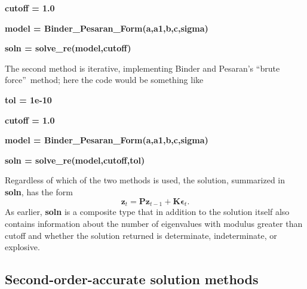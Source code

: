 \documentclass[thmsa,notitlepage,11pt]{article}
\begin{document}
\bigskip

\textbf{cutoff = 1.0}

\textbf{model = Binder\_Pesaran\_Form(a,a1,b,c,sigma)}

\textbf{soln = solve\_re(model,cutoff)}

\bigskip

The second method is iterative, implementing Binder and Pesaran's
\textquotedblleft brute force\textquotedblright\ method; here the code would
be something like

\bigskip

\textbf{tol = 1e-10}

\textbf{cutoff = 1.0}

\textbf{model = Binder\_Pesaran\_Form(a,a1,b,c,sigma)}

\textbf{soln = solve\_re(model,cutoff,tol)}

\bigskip

Regardless of which of the two methods is used, the solution, summarized in 
\textbf{soln}, has the form%
\[
\mathbf{z}_{t}=\mathbf{Pz}_{t-1}+\mathbf{K\epsilon }_{t}. 
\]%
As earlier, \textbf{soln} is a composite type that in addition to the
solution itself also contains information about the number of eigenvalues
with modulus greater than cutoff and whether the solution returned is
determinate, indeterminate, or explosive.

\subsection{Second-order-accurate solution methods}
\end{document}
